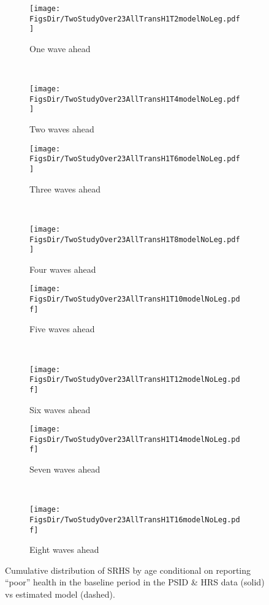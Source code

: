 \documentclass[12pt,pdftex,letterpaper]{article}
\newcommand{\RootDir}{..}
\newcommand{\FigsDir}{\RootDir/Figures}
\begin{document}
\begin{figure}
	\centering
	\begin{subfigure}[b]{0.45\textwidth}
		\texttt{[image: \\FigsDir/TwoStudyOver23AllTransH1T2modelNoLeg.pdf]}
		\caption{One wave ahead}\label{fig:Model1AheadPoor}
	\end{subfigure}
	~
	\begin{subfigure}[b]{0.45\textwidth}
		\texttt{[image: \\FigsDir/TwoStudyOver23AllTransH1T4modelNoLeg.pdf]}
		\caption{Two waves ahead}\label{fig:Model2AheadPoor}
	\end{subfigure}
	
	\begin{subfigure}[b]{0.45\textwidth}
		\texttt{[image: \\FigsDir/TwoStudyOver23AllTransH1T6modelNoLeg.pdf]}
		\caption{Three waves ahead}\label{fig:Model3AheadPoor}
	\end{subfigure}
	~
	\begin{subfigure}[b]{0.45\textwidth}
		\texttt{[image: \\FigsDir/TwoStudyOver23AllTransH1T8modelNoLeg.pdf]}
		\caption{Four waves ahead}\label{fig:Model4AheadPoor}
	\end{subfigure}
	
	\begin{subfigure}[b]{0.45\textwidth}
		\texttt{[image: \\FigsDir/TwoStudyOver23AllTransH1T10modelNoLeg.pdf]}
		\caption{Five waves ahead}\label{fig:Model5AheadPoor}
	\end{subfigure}
	~
	\begin{subfigure}[b]{0.45\textwidth}
		\texttt{[image: \\FigsDir/TwoStudyOver23AllTransH1T12modelNoLeg.pdf]}
		\caption{Six waves ahead}\label{fig:Model6AheadPoor}
	\end{subfigure}

	\begin{subfigure}[b]{0.45\textwidth}
		\texttt{[image: \\FigsDir/TwoStudyOver23AllTransH1T14modelNoLeg.pdf]}
		\caption{Seven waves ahead}\label{fig:Model7AheadPoor}
	\end{subfigure}
	~
	\begin{subfigure}[b]{0.45\textwidth}
		\texttt{[image: \\FigsDir/TwoStudyOver23AllTransH1T16modelNoLeg.pdf]}
		\caption{Eight waves ahead}\label{fig:Model8AheadPoor}
	\end{subfigure}
	\caption{Cumulative distribution of SRHS by age conditional on reporting ``poor'' health in the baseline period in the PSID \& HRS data (solid) vs estimated model (dashed).}\label{fig:ModelTransPR}
\end{figure}
\end{document}
